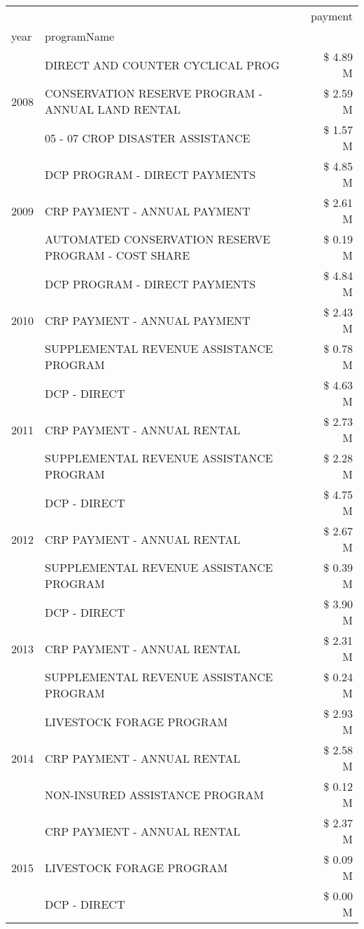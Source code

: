 \begin{tabular}{llr}
\toprule
 &  & payment \\
year & programName &  \\
\midrule
\multirow[t]{3}{*}{2008} & DIRECT AND COUNTER CYCLICAL PROG & \$ 4.89 M \\
 & CONSERVATION RESERVE PROGRAM - ANNUAL LAND RENTAL & \$ 2.59 M \\
 & 05 - 07 CROP DISASTER ASSISTANCE & \$ 1.57 M \\
\cline{1-3}
\multirow[t]{3}{*}{2009} & DCP PROGRAM - DIRECT PAYMENTS & \$ 4.85 M \\
 & CRP PAYMENT - ANNUAL PAYMENT & \$ 2.61 M \\
 & AUTOMATED CONSERVATION RESERVE PROGRAM - COST SHARE & \$ 0.19 M \\
\cline{1-3}
\multirow[t]{3}{*}{2010} & DCP PROGRAM - DIRECT PAYMENTS & \$ 4.84 M \\
 & CRP PAYMENT - ANNUAL PAYMENT & \$ 2.43 M \\
 & SUPPLEMENTAL REVENUE ASSISTANCE PROGRAM & \$ 0.78 M \\
\cline{1-3}
\multirow[t]{3}{*}{2011} & DCP - DIRECT & \$ 4.63 M \\
 & CRP PAYMENT - ANNUAL RENTAL & \$ 2.73 M \\
 & SUPPLEMENTAL REVENUE ASSISTANCE PROGRAM & \$ 2.28 M \\
\cline{1-3}
\multirow[t]{3}{*}{2012} & DCP - DIRECT & \$ 4.75 M \\
 & CRP PAYMENT - ANNUAL RENTAL & \$ 2.67 M \\
 & SUPPLEMENTAL REVENUE ASSISTANCE PROGRAM & \$ 0.39 M \\
\cline{1-3}
\multirow[t]{3}{*}{2013} & DCP - DIRECT & \$ 3.90 M \\
 & CRP PAYMENT - ANNUAL RENTAL & \$ 2.31 M \\
 & SUPPLEMENTAL REVENUE ASSISTANCE PROGRAM & \$ 0.24 M \\
\cline{1-3}
\multirow[t]{3}{*}{2014} & LIVESTOCK FORAGE PROGRAM & \$ 2.93 M \\
 & CRP PAYMENT - ANNUAL RENTAL & \$ 2.58 M \\
 & NON-INSURED ASSISTANCE PROGRAM & \$ 0.12 M \\
\cline{1-3}
\multirow[t]{3}{*}{2015} & CRP PAYMENT - ANNUAL RENTAL & \$ 2.37 M \\
 & LIVESTOCK FORAGE PROGRAM & \$ 0.09 M \\
 & DCP - DIRECT & \$ 0.00 M \\
\cline{1-3}

\end{tabular}
